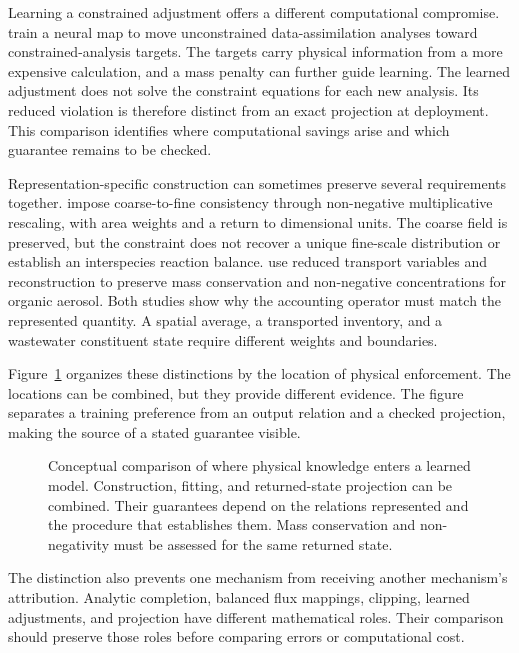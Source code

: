 Learning a constrained adjustment offers a different computational compromise. \citet{Ruckstuhl2021} train a neural map to move unconstrained data-assimilation analyses toward constrained-analysis targets. The targets carry physical information from a more expensive calculation, and a mass penalty can further guide learning. The learned adjustment does not solve the constraint equations for each new analysis. Its reduced violation is therefore distinct from an exact projection at deployment. This comparison identifies where computational savings arise and which guarantee remains to be checked.

Representation-specific construction can sometimes preserve several requirements together. \citet{Geiss2022} impose coarse-to-fine consistency through non-negative multiplicative rescaling, with area weights and a return to dimensional units. The coarse field is preserved, but the constraint does not recover a unique fine-scale distribution or establish an interspecies reaction balance. \citet{Sturm2023} use reduced transport variables and reconstruction to preserve mass conservation and non-negative concentrations for organic aerosol. Both studies show why the accounting operator must match the represented quantity. A spatial average, a transported inventory, and a wastewater constituent state require different weights and boundaries.

Figure~\ref{fig:rrl_enforcement_locations} organizes these distinctions by the location of physical enforcement. The locations can be combined, but they provide different evidence. The figure separates a training preference from an output relation and a checked projection, making the source of a stated guarantee visible.

\begin{figure}[htbp]
\centering
\begingroup\linespread{1}\selectfont

\endgroup
\caption{Conceptual comparison of where physical knowledge enters a learned model. Construction, fitting, and returned-state projection can be combined. Their guarantees depend on the relations represented and the procedure that establishes them. Mass conservation and non-negativity must be assessed for the same returned state.}
\label{fig:rrl_enforcement_locations}
\end{figure}

The distinction also prevents one mechanism from receiving another mechanism's attribution. Analytic completion, balanced flux mappings, clipping, learned adjustments, and projection have different mathematical roles. Their comparison should preserve those roles before comparing errors or computational cost.

